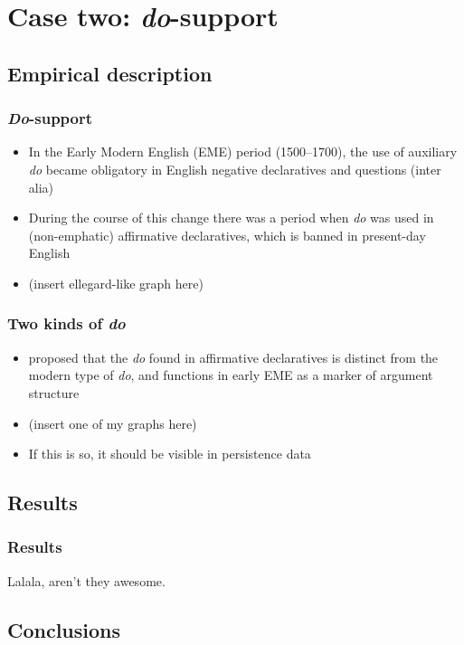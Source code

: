 \documentclass{digs-slides}
\begin{document}
\section{Case two: \emph{do}-support}
\label{sec:case-two:-emphdo}

\subsection{Empirical description}
\label{sec:empir-descr}

\begin{frame}
    \frametitle{\emph{Do}-support}
    \begin{itemize}
      \item In the Early Modern English (EME) period (1500–1700),
        the use of auxiliary \emph{do} became obligatory in English
        negative declaratives and questions (inter alia)
      \item During the course of this change there was a period when
        \emph{do} was used in (non-emphatic) affirmative declaratives,
        which is banned in present-day English
      \item (insert ellegard-like graph here) %
    \end{itemize}
\end{frame}

\begin{frame}
    \frametitle{Two kinds of \emph{do}}
    \begin{itemize}
      \item \textcite{Ecay2012a} proposed that the \emph{do} found in
        affirmative declaratives is distinct from the modern type of
        \emph{do}, and functions in early EME as a marker of argument
        structure
      \item (insert one of my graphs here)
      \item If this is so, it should be visible in persistence data
    \end{itemize}
\end{frame}

\subsection{Results}
\label{sec:results}

\begin{frame}
    \frametitle{Results}
    Lalala, aren’t they awesome.
\end{frame}

\subsection{Conclusions}
\label{sec:conclusions-do}
\end{document}
